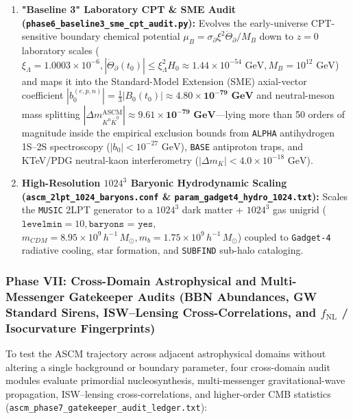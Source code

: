 \documentclass[aps,prd,onecolumn,superscriptaddress,nofootinbib,longbibliography,10pt]{revtex4-2}
\begin{document}
{{\begin{enumerate}
\item \textbf{"Baseline 3" Laboratory CPT \& SME Audit (\texttt{phase6_baseline3_sme_cpt_audit.py}):} Evolves the early-universe CPT-sensitive boundary chemical potential \(\mu_B = \sigma_{\partial}\xi^2\dot{\Theta}_{\partial}/M_B\) down to \(z = 0\) laboratory scales (\(\xi_\Lambda = 1.0003 \times 10^{-6}, |\dot{\Theta}_{\partial}(t_0)| \le \xi_\Lambda^2 H_0 \approx 1.44 \times 10^{-54}\text{ GeV}, M_B = 10^{12}\text{ GeV}\)) and maps it into the Standard-Model Extension (SME) axial-vector coefficient \(|b_0^{(e,p,n)}| = \frac{1}{3}|B_0(t_0)| \approx \mathbf{4.80 \times 10^{-79}\text{ GeV}}\) and neutral-meson mass splitting \(|\Delta m_{K^0\bar{K}^0}^{\text{ASCM}}| \approx \mathbf{9.61 \times 10^{-79}\text{ GeV}}\)—lying more than 50 orders of magnitude inside the empirical exclusion bounds from \texttt{ALPHA} antihydrogen 1S–2S spectroscopy (\(|b_0| < 10^{-27}\text{ GeV}\)), \texttt{BASE} antiproton traps, and KTeV/PDG neutral-kaon interferometry (\(|\Delta m_K| < 4.0 \times 10^{-18}\text{ GeV}\)).
  
\item \textbf{High-Resolution \(1024^3\) Baryonic Hydrodynamic Scaling (\texttt{ascm_2lpt_1024_baryons.conf} \& \texttt{param_gadget4_hydro_1024.txt}):} Scales the \texttt{MUSIC} 2LPT generator to a \(1024^3\) dark matter + \(1024^3\) gas unigrid (\(\texttt{levelmin} = 10, \texttt{baryons = yes}\), \(m_{CDM} = 8.95 \times 10^9\,h^{-1}\,M_\odot, m_b = 1.75 \times 10^9\,h^{-1}\,M_\odot\)) coupled to \texttt{Gadget-4} radiative cooling, star formation, and \texttt{SUBFIND} sub-halo cataloging.

\end{enumerate}




\subsubsection*{Phase VII: Cross-Domain Astrophysical and Multi-Messenger Gatekeeper Audits (BBN Abundances, GW Standard Sirens, ISW–Lensing Cross-Correlations, and \(f_{\mathrm{NL}}\) / Isocurvature Fingerprints)}

To test the ASCM trajectory across adjacent astrophysical domains without altering a single background or boundary parameter, four cross-domain audit modules evaluate primordial nucleosynthesis, multi-messenger gravitational-wave propagation, ISW–lensing cross-correlations, and higher-order CMB statistics (\texttt{ascm_phase7_gatekeeper_audit_ledger.txt}):



}}
\end{document}
